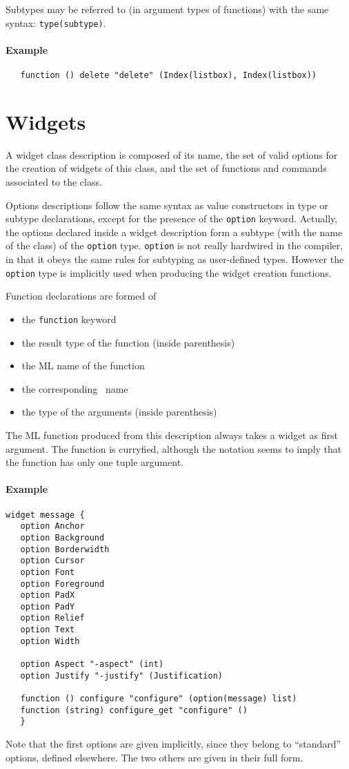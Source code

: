 Subtypes may be referred to (in argument types of functions) with the same
syntax: \verb|type(subtype)|.
\paragraph{Example}
\begin{verbatim}
   function () delete "delete" (Index(listbox), Index(listbox))
\end{verbatim} 

\section{Widgets}
A widget class description is composed of its name, the set of valid options
for the creation of widgets of this class, and the set of functions and
commands associated to the class.

Options descriptions follow the same syntax as value constructors in type or
subtype declarations, except for the presence of the \verb|option| keyword.
Actually, the options declared inside a widget description form a subtype
(with the name of the class) of the \verb|option| type. 
\verb|option| is not really hardwired in the compiler, in that it obeys the
same rules for subtyping as user-defined types. However the \verb|option|
type is implicitly used when producing the widget creation functions.

Function declarations are formed of
\begin{itemize}
\item the \verb|function| keyword
\item the result type of the function (inside parenthesis)
\item the ML name of the function
\item the corresponding \tk\ name
\item the type of the arguments (inside parenthesis)
\end{itemize} 

The ML function produced from this description always takes a widget as
first argument. The function is curryfied, although the notation seems to
imply that the function has only one tuple argument.


\paragraph{Example}
\begin{verbatim}
widget message {
   option Anchor
   option Background
   option Borderwidth
   option Cursor
   option Font
   option Foreground
   option PadX
   option PadY
   option Relief
   option Text
   option Width

   option Aspect "-aspect" (int)
   option Justify "-justify" (Justification)

   function () configure "configure" (option(message) list)
   function (string) configure_get "configure" ()
   }
\end{verbatim}
Note that the first options are given implicitly, since they belong to
``standard'' options, defined elsewhere. The two others are given in their
full form. 

